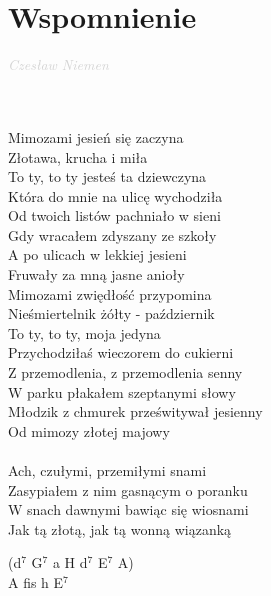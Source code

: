 \documentclass[a5paper, 10pt]{book}
\begin{document}
\newpage
\section{Wspomnienie}\textcolor{lightgray}{\textit{Czesław Niemen}}\\~\\
\begin{minipage}[t]{0.7\textwidth}
~\\
Mimozami jesień się zaczyna\\
Złotawa, krucha i miła\\
To ty, to ty jesteś ta dziewczyna\\
Która do mnie na ulicę wychodziła\\
\hspace*{5mm}Od twoich listów pachniało w sieni\\
\hspace*{5mm}Gdy wracałem zdyszany ze szkoły\\
\hspace*{5mm}A po ulicach w lekkiej jesieni\\
\hspace*{5mm}Fruwały za mną jasne anioły\\

Mimozami zwiędłość przypomina\\
Nieśmiertelnik żółty - październik\\
To ty, to ty, moja jedyna\\
Przychodziłaś wieczorem do cukierni\\
\hspace*{5mm}Z przemodlenia, z przemodlenia senny\\
\hspace*{5mm}W parku płakałem szeptanymi słowy\\
\hspace*{5mm}Młodzik z chmurek prześwitywał jesienny\\
\hspace*{5mm}Od mimozy złotej majowy\\
\\
\hspace*{5mm}Ach, czułymi, przemiłymi snami\\
\hspace*{5mm}Zasypiałem z nim gasnącym o poranku\\
\hspace*{5mm}W snach dawnymi bawiąc się wiosnami\\
\hspace*{5mm}Jak tą złotą, jak tą wonną wiązanką\\
\end{minipage}
\begin{minipage}[t]{0.3\textwidth}
  (d$^7$ G$^7$ a H d$^7$ E$^7$ A)\\
  A fis h E$^7$\\
\end{minipage}
\end{document}
